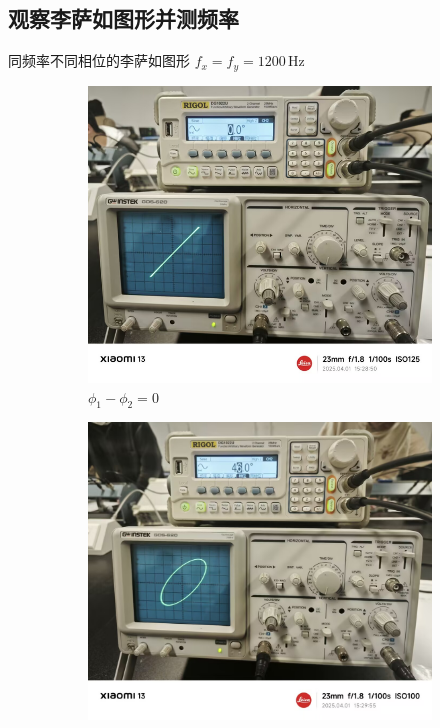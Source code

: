 \documentclass[12pt,a4paper]{article}
\begin{document}
	\subsection{观察李萨如图形并测频率}
	同频率不同相位的李萨如图形 \quad $f_x=f_y=1200\,\mathrm{Hz}$
	\begin{figure}[H]
		\centering
		\begin{subfigure}[b]{0.23\textwidth}
			\centering
			\includegraphics[width=\textwidth]{0.jpg}
			\caption{$\phi_1-\phi_2=0$}
			\label{fig:sub0}
		\end{subfigure}
		\hfill
		\begin{subfigure}[b]{0.23\textwidth}
			\centering
			\includegraphics[width=\textwidth]{45.jpg}

\end{subfigure}
\end{figure}
\end{document}
